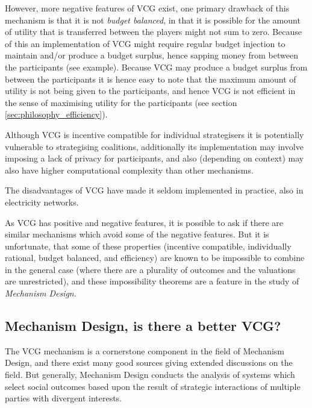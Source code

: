 However, more negative features of VCG exist, one primary drawback of this mechanism is that it is not \textit{budget balanced}, in that it is possible for the amount of utility that is transferred between the players might not sum to zero.
Because of this an implementation of VCG might require regular budget injection to maintain and/or produce a budget surplus, hence sapping money from between the participants (see example).
Because VCG may produce a budget surplus from between the participants it is hence easy to note that the maximum amount of utility is not being given to the participants, and hence VCG is not efficient in the sense of maximising utility for the participants (see section \ref{sec:philosophy_efficiency}).

Although VCG is incentive compatible for individual strategisers it is potentially vulnerable to strategising coalitions, additionally its implementation may involve imposing a lack of privacy for participants, and also (depending on context) may also have higher computational complexity than other mechanisms.\cite{ShohamLeytonBrown09}

The disadvantages of VCG have made it seldom implemented in practice, also in electricity networks.\cite{Rothkopf07, Ausubel2006}

As VCG has positive and negative features, it is possible to ask if there are similar mechanisms which avoid some of the negative features.
But it is unfortunate, that some of these properties (incentive compatible, individually rational, budget balanced, and efficiency) are known to be impossible to combine in the general case (where there are a plurality of outcomes and the valuations are unrestricted), and these impossibility theorems are a feature in the study of \textit{Mechanism Design}.%

\subsection{Mechanism Design, is there a better VCG?}

The VCG mechanism is a cornerstone component in the field of Mechanism Design, and there exist many good sources giving extended discussions on the field.\cite{37377}
But generally, Mechanism Design conducts the analysis of systems which select social outcomes based upon the result of strategic interactions of multiple parties with divergent interests.%

